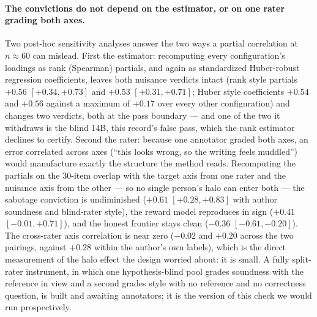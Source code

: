 \documentclass[11pt]{article}
\begin{document}
\paragraph{The convictions do not depend on the estimator, or on one rater grading both axes.}
Two post-hoc sensitivity analyses answer the two ways a partial correlation at $n \approx 60$ can mislead.
First the estimator: recomputing every configuration's loadings as rank (Spearman) partials, and again as standardized Huber-robust regression coefficients, leaves both nuisance verdicts intact (rank style partials $+0.56$ $[+0.34,+0.73]$ and $+0.53$ $[+0.31,+0.71]$; Huber style coefficients $+0.54$ and $+0.56$ against a maximum of $+0.17$ over every other configuration) and changes two verdicts, both at the pass boundary --- and one of the two it withdraws is the blind 14B, this record's false pass, which the rank estimator declines to certify.
Second the rater: because one annotator graded both axes, an error correlated across axes (``this looks wrong, so the writing feels muddled'') would manufacture exactly the structure the method reads.
Recomputing the partials on the 30-item overlap with the target axis from one rater and the nuisance axis from the other --- so no single person's halo can enter both --- the sabotage conviction is undiminished ($+0.61$ $[+0.28, +0.83]$ with author soundness and blind-rater style), the reward model reproduces in sign ($+0.41$ $[-0.01, +0.71]$), and the honest frontier stays clean ($-0.36$ $[-0.61, -0.20]$).
The cross-rater axis correlation is near zero ($-0.02$ and $+0.20$ across the two pairings, against $+0.28$ within the author's own labels), which is the direct measurement of the halo effect the design worried about: it is small.
A fully split-rater instrument, in which one hypothesis-blind pool grades soundness with the reference in view and a second grades style with no reference and no correctness question, is built and awaiting annotators; it is the version of this check we would run prospectively.
\end{document}
